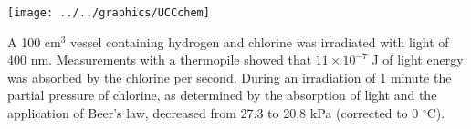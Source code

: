 \documentclass[addpoints,12pt]{exam}
\begin{document}
\begin{center}
\texttt{[image: ../../graphics/UCCchem]}

\end{center}
\vspace{0.1in}


\begin{questions}
\pointformat{\bfseries\boldmath[ \thepoints]}

\question[5]

A 100 cm\(^3\) vessel containing hydrogen and chlorine was irradiated with light of 400 nm. Measurements with a thermopile showed that \(11 \times 10^{-7}\) J of light energy was absorbed by the chlorine per second. During an irradiation of 1 minute the partial pressure of chlorine, as determined by the absorption of light and the application of Beer's law, decreased from 27.3 to 20.8 kPa (corrected to 0 \(^\circ\)C).

\end{questions}
\end{document}
